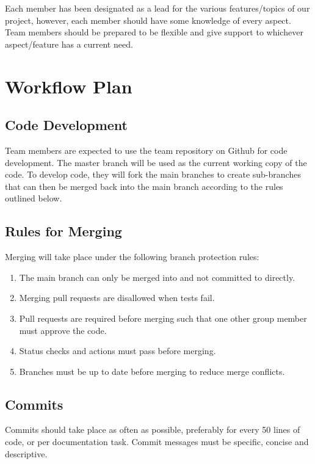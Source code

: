 \documentclass{article}
\begin{document}
Each member has been designated as a lead for the various features/topics of our project, however, each member should have some knowledge of every aspect.  Team members should be prepared to be flexible and give support to whichever aspect/feature has a current need. 

\section{Workflow Plan}

\subsection{Code Development}

Team members are expected to use the team repository on Github for code development. The master branch will be used as the current working copy of the code. To develop code, they will fork the main branches to create sub-branches that can then be merged back into the main branch according to the rules outlined below. 

\subsection{Rules for Merging}

Merging will take place under the following branch protection rules: 

\begin{enumerate}

\item The main branch can only be merged into and not committed to directly. 
\item Merging pull requests are disallowed when tests fail. 
\item Pull requests are required before merging such that one other group member must approve the code. 
\item Status checks and actions must pass before merging. 
\item Branches must be up to date before merging to reduce merge conflicts. 

\end{enumerate} 

\subsection{Commits}

Commits should take place as often as possible, preferably for every 50 lines of code, or per documentation task. Commit messages must be specific, concise and descriptive. 
\end{document}
